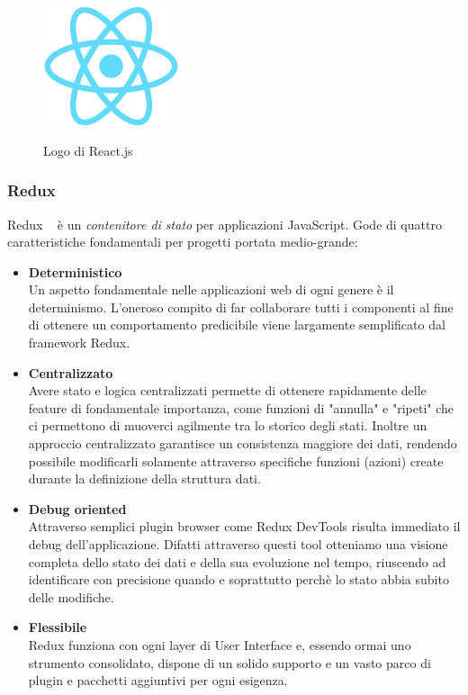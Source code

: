 \begin{figure}[H]
    \caption{Logo di React.js ~\cite{React:online}}
    \centering
    \includegraphics[width=40mm]{img/logos/react_logo.png}
    \label{fig:react_logo}
\end{figure}
\subsubsection{Redux}
Redux ~\cite{caratteristiche_redux} è un \emph{contenitore di stato} per applicazioni JavaScript.\newline
Gode di quattro caratteristiche fondamentali per progetti portata medio-grande:
\begin{itemize}
  \item \textbf{Deterministico}\\
  Un aspetto fondamentale nelle applicazioni web di ogni genere è il determinismo.\newline
  L'oneroso compito di far collaborare tutti i componenti al fine di ottenere un comportamento predicibile viene largamente semplificato dal framework Redux.
  \item \textbf{Centralizzato}\\
  Avere stato e logica centralizzati permette di ottenere rapidamente delle feature di fondamentale importanza, come funzioni di "annulla" e "ripeti" che ci permettono di muoverci agilmente tra lo storico degli stati.\newline
  Inoltre un approccio centralizzato garantisce un consistenza maggiore dei dati, rendendo possibile modificarli solamente attraverso specifiche funzioni (azioni) create durante la definizione della struttura dati.
  \item \textbf{Debug oriented}\\
  Attraverso semplici plugin browser come Redux DevTools risulta immediato il debug dell'applicazione.\newline
  Difatti attraverso questi tool otteniamo una visione completa dello stato dei dati e della sua evoluzione nel tempo, riuscendo ad identificare con precisione quando e soprattutto perchè lo stato abbia subito delle modifiche.
  \item \textbf{Flessibile}\\
  Redux funziona con ogni layer di User Interface e, essendo ormai uno strumento consolidato, dispone di un solido supporto e un vasto parco di plugin e pacchetti aggiuntivi per ogni esigenza.
\end{itemize}
